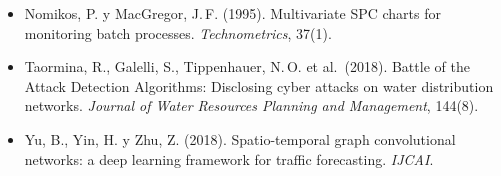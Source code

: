 \documentclass[11pt,a4paper]{article}
\begin{document}
\begin{itemize}[leftmargin=*,label={}]
  (8.\textsuperscript{a} ed.). Wiley.
\item Nomikos, P. y MacGregor, J.\,F. (1995). Multivariate SPC charts for monitoring
  batch processes. \emph{Technometrics}, 37(1).
\item Taormina, R., Galelli, S., Tippenhauer, N.\,O. et al.\ (2018). Battle of the
  Attack Detection Algorithms: Disclosing cyber attacks on water distribution
  networks. \emph{Journal of Water Resources Planning and Management}, 144(8).
\item Yu, B., Yin, H. y Zhu, Z. (2018). Spatio-temporal graph convolutional networks: a
  deep learning framework for traffic forecasting. \emph{IJCAI}.
\end{itemize}
\end{document}
